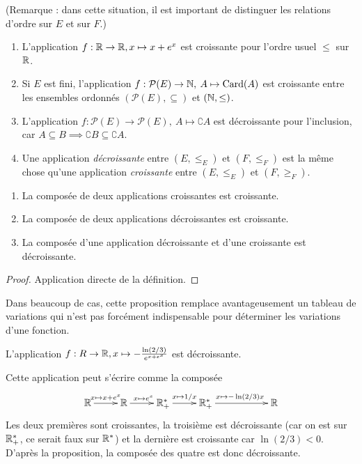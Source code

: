 (Remarque : dans cette situation, il est important de distinguer les relations d'ordre sur $E$ et sur $F$.)

\begin{exemple}
\begin{enumerate}
\item L'application $f : \mathbb{R}\to \mathbb{R}, x\mapsto x+e^x$ est croissante pour l'ordre usuel $\leq $ sur $\mathbb{R}$.
\item Si $E$ est fini, l'application $f : \mathcal P(E) \to \mathbb{N}, \: A\mapsto \operatorname{Card}(A)$ est croissante entre les ensembles ordonnés $(\mathcal P(E), \subseteq)$ et $(\mathbb{N}, \leq)$.
\item L'application $f : \mathcal P(E) \to \mathcal P(E), \: A\mapsto \complement A$ est décroissante pour l'inclusion, car $A\subseteq B \implies \complement B\subseteq \complement A$.
\item Une application \emph{décroissante} entre $(E,\leq_E)$ et $(F,\leq_F)$ est la même chose qu'une application \emph{croissante} entre $(E,\leq_E)$ et $(F,\geq_F)$.
\end{enumerate}
\end{exemple}




\begin{proposition}
\begin{enumerate}
\item La composée de deux applications croissantes est croissante.
\item La composée de deux applications décroissantes est croissante.
\item La composée d'une application décroissante et d'une croissante est décroissante.
\end{enumerate}
\end{proposition}

\begin{proof}
Application directe de la définition.
\end{proof}

Dans beaucoup de cas, cette proposition remplace avantageusement un \og tableau de variations\fg{} qui n'est pas forcément indispensable pour déterminer les variations d'une fonction.

\begin{exemple}
L'application $f : R\to \mathbb{R}, x\mapsto -\frac{\ln(2/3)}{e^{x+e^x}}$ est décroissante.
\end{exemple}
\begin{red}
Cette application peut s'écrire comme la composée
\[\xymatrix{
\R \ar[r]^{x\mapsto x+e^x}
& \R \ar[r]^{x\mapsto e^x}
& \R_+^* \ar[r]^{x\mapsto 1/x}
& \R_+^* \ar[rr]^{x\mapsto -\ln(2/3)x}
& & \R
} \]
Les deux premières sont croissantes, la troisième est décroissante (car on est sur $\mathbb{R}_+^*$, ce serait faux sur $\mathbb{R}^*$) et la dernière est croissante car $\ln(2/3)<0$. D'après la proposition, la composée des quatre est donc décroissante.
\end{red}



